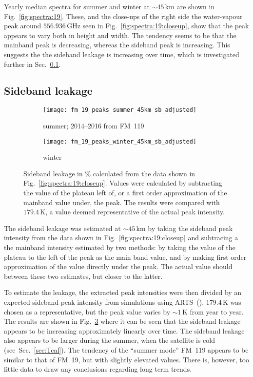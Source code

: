 \noindent
Yearly median spectra for summer and winter at $\sim45\,\mathrm{km}$ are shown
in Fig.~\ref{fig:spectra:19}.  These, and the close-ups of the right side the
water-vapour peak around $556.936\,\mathrm{GHz}$ seen in
Fig.~\ref{fig:spectra:19:closeup}, show that the peak appears to vary both in
height and width.  The tendency seems to be that the mainband peak is
decreasing, whereas the sideband peak is increasing.  This suggests the the
sideband leakage is increasing over time, which is investigated further in
Sec.~\ref{FM19:sbl}.


\subsection{Sideband leakage}
\label{FM19:sbl}

\begin{figure}[ht]
    \centering
    \begin{subfigure}[b]{0.9545\textwidth}
        \texttt{[image: fm\_19\_peaks\_summer\_45km\_sb\_adjusted]}
        \caption{summer; 2014--2016 from FM~119
            }\label{fig:sbl:19:summer}
    \end{subfigure}
    \begin{subfigure}[b]{0.9545\textwidth}
        \texttt{[image: fm\_19\_peaks\_winter\_45km\_sb\_adjusted]}
        \caption{winter}\label{fig:sbl:19:winter}
    \end{subfigure}
    \caption{Sideband leakage in \% calculated from the data shown in
        Fig.~\ref{fig:spectra:19:closeup}.  Values were calculated by
        subtracting the value of the plateau left of, or a first order
        approximation of the mainband value under, the peak.  The results were
        compared with $179.4\,\mathrm{K}$, a value deemed representative of the
        actual peak intensity.
        }\label{fig:sbl:19}
\end{figure}

\noindent
The sideband leakage was estimated at $\sim45\,\mathrm{km}$ by taking the
sideband peak intensity from the data shown in
Fig.~\ref{fig:spectra:19:closeup} and subtracing a the mainband intensity
estimated by two methods:  by taking the value of the plateau to the left of
the peak as the main band value, and by making first order approximation of the
value directly under the peak.  The actual value should between these two
estimates, but closer to the latter.

To estimate the leakage, the extracted peak intensities were then divided by an
expected sideband peak intensity from simulations using
ARTS~(\cite{buehler:artst:05}).  $179.4\,\mathrm{K}$ was chosen as a
representative, but the peak value varies by $\sim1\,\mathrm{K}$ from year to
year.  The results are shown in Fig.~\ref{fig:sbl:19} where it can be seen that
the sideband leakage appears to be increasing approximately linearly over time.
The sideband leakage also appears to be larger during the summer, when the
satellite is cold (see~Sec.~\ref{sec:Tcal}).  The tendency of the ``summer
mode'' FM~119 appears to be similar to that of FM~19, but with slightly
elevated values.  There is, however, too little data to draw any conclusions
regarding long term trends.


